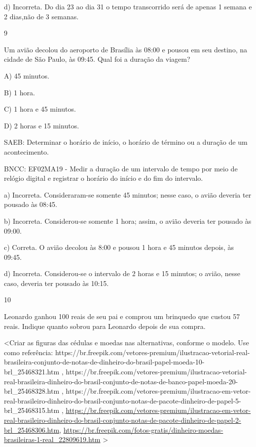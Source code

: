 \begin{escolha}
\begin{escolha}
{{{{{{{{d) Incorreta. Do dia 23 ao dia 31 o tempo transcorrido será de apenas 1 semana e 2 dias,não de 3
semanas.

\num{9}

Um avião decolou do aeroporto de Brasília às 08:00 e pousou em seu
destino, na cidade de São Paulo, às 09:45. Qual foi a duração da viagem?

A) 45 minutos.

B) 1 hora.

C) 1 hora e 45 minutos.

D) 2 horas e 15 minutos.

SAEB: Determinar o horário de início, o horário de término ou a
duração de um acontecimento.

BNCC: EF02MA19 - Medir a duração de um intervalo de tempo por meio de
relógio digital e registrar o horário do início e do fim do intervalo.

a) Incorreta. Consideraram-se somente 45 minutos; nesse caso, o avião deveria ter pousado
às 08:45.

b) Incorreta. Considerou-se somente 1 hora; assim, o avião deveria ter
pousado às 09:00.

c) Correta. O avião decolou às 8:00 e pousou 1 hora e 45 minutos depois, às 09:45.

d) Incorreta. Considerou-se o intervalo de 2 horas e 15 minutos; o avião, nesse caso, deveria ter
pousado às 10:15.

\num{10}

Leonardo ganhou 100 reais de seu pai e comprou um brinquedo que custou
57 reais. Indique quanto sobrou para Leonardo depois de sua compra.

\textless{}Criar as figuras das cédulas e moedas nas alternativas,
conforme o modelo. Use como referência:
https://br.freepik.com/vetores-premium/ilustracao-vetorial-real-brasileira-conjunto-de-notas-de-dinheiro-do-brasil-papel-moeda-10-brl\_25468321.htm
,
https://br.freepik.com/vetores-premium/ilustracao-vetorial-real-brasileira-dinheiro-do-brasil-conjunto-de-notas-de-banco-papel-moeda-20-brl\_25468328.htm
,
https://br.freepik.com/vetores-premium/ilustracao-em-vetor-real-brasileiro-dinheiro-do-brasil-conjunto-notas-de-pacote-dinheiro-de-papel-5-brl\_25468315.htm
,
\url{https://br.freepik.com/vetores-premium/ilustracao-em-vetor-real-brasileiro-dinheiro-do-brasil-conjunto-notas-de-pacote-dinheiro-de-papel-2-brl_25468306.htm},
\url{https://br.freepik.com/fotos-gratis/dinheiro-moedas-brasileiras-1-real_22809619.htm}
\textgreater{}

}}}}}}}}
\end{escolha}
\end{escolha}
